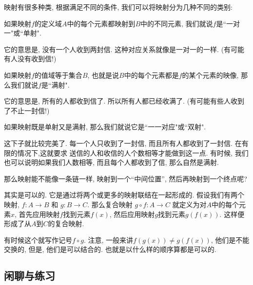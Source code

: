 
映射有很多种类, 根据满足不同的条件, 我们可以将映射分为几种不同的类别: 

\begin{definition}
  如果映射$f$的定义域$A$中的每个元素都映射到$B$中的不同元素, 我们就说$f$是``一对一"或``单射". 
\end{definition}

它的意思是, 没有一个人收到两封信. 这种对应关系就像是一对一的一样. (有可能有人没有收到信!)

\begin{definition}
  如果映射$f$的值域等于集合$B$, 也就是说$B$中的每个元素都是$f$的某个元素的映像, 那么我们就说$f$是``满射". 
\end{definition}

它的意思是, 所有的人都收到信了. 所以所有人都已经收满了. (有可能有些人收到了不止一封信!)

\begin{definition}
  如果映射既是单射又是满射, 那么我们就说它是``一一对应"或``双射". 
\end{definition}

这下子就比较完美了. 每一个人只收到了一封信, 而且所有人都收到了一封信. 在有限的情况下,这就要求
送信的人和收信的人个数相等才能做到这一点. 有时候, 我们也可以说明如果我们人数相等,
而且每个人都收到了信, 那么自然是满射. 

 那么映射能不能像一条链一样, 映射到一个``中间位置'', 
然后再映射到一个终点呢?  

其实是可以的. 它是通过将两个或更多的映射联结在一起形成的. 
假设我们有两个映射, $f: A \to B$ 和 $g: B \to C$. 
那么复合映射 $g\circ f: A \to C$ 就定义为对$A$中的每个元素$x$, 
首先应用映射$f$找到元素$f(x)$, 然后应用映射$g$找到元素$g(f(x))$. 
这样便形成了从$A$到$C$的复合映射. 

有时候这个就写作记号$f\circ g$. 注意, 一般来讲$f(g(x))\neq g(f(x))$, 他们是不能交换的, 
但是, 他们是可以结合的. 也就是以什么样的顺序算都是可以的. 

\subsection*{闲聊与练习}

